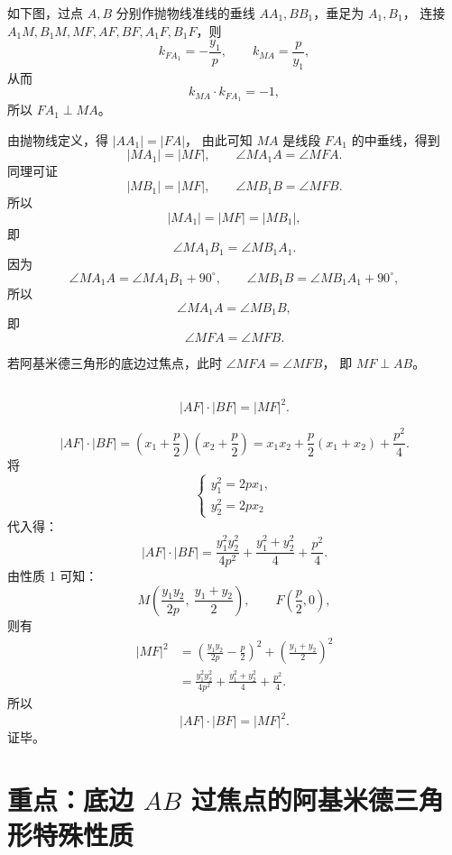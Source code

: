\documentclass{ctexart}
\begin{document}
	\textbf{\color{red}{证明：}}
	如下图，过点 $A,B$ 分别作抛物线准线的垂线 $AA_1,BB_1$，垂足为 $A_1,B_1$，
	连接 $A_1M,B_1M,MF,AF,BF,A_1F,B_1F$，则
	\[
	k_{FA_1}=-\frac{y_1}{p},\qquad k_{MA}=\frac{p}{y_1},
	\]
	从而
	\[
	k_{MA}\cdot k_{FA_1}=-1,
	\]
	所以 $FA_1\perp MA$。
	
	由抛物线定义，得 $|AA_1|=|FA|$，
	由此可知 $MA$ 是线段 $FA_1$ 的中垂线，得到
	\[
	|MA_1|=|MF|,\qquad \angle MA_1A=\angle MFA.
	\]
	同理可证
	\[
	|MB_1|=|MF|,\qquad \angle MB_1B=\angle MFB.
	\]
	所以
	\[
	|MA_1|=|MF|=|MB_1|,
	\]
	即
	\[
	\angle MA_1B_1=\angle MB_1A_1.
	\]
	因为
	\[
	\angle MA_1A=\angle MA_1B_1+90^\circ,\qquad
	\angle MB_1B=\angle MB_1A_1+90^\circ,
	\]
	所以
	\[
	\angle MA_1A=\angle MB_1B,
	\]
	即
	\[
	\angle MFA=\angle MFB.
	\]
	
	\textbf{\color{red}{特别的：}}
	若阿基米德三角形的底边过焦点，此时 $\angle MFA=\angle MFB$，
	即 $MF\perp AB$。
	
	\subsection*{\color{green!60!black}{性质 4}}
	\[
	|AF|\cdot|BF|=|MF|^2.
	\]
	
	\textbf{\color{red}{证明：}}
	\[
	|AF|\cdot|BF|
	=\left(x_1+\frac p2\right)\left(x_2+\frac p2\right)
	=x_1x_2+\frac p2(x_1+x_2)+\frac{p^2}{4}.
	\]
	将
	\[
	\begin{cases}
		y_1^2=2px_1,\\
		y_2^2=2px_2
	\end{cases}
	\]
	代入得：
	\[
	|AF|\cdot|BF|
	=\frac{y_1^2y_2^2}{4p^2}+\frac{y_1^2+y_2^2}{4}+\frac{p^2}{4}.
	\]
	由性质 1 可知：
	\[
	M\!\left(\frac{y_1y_2}{2p},\ \frac{y_1+y_2}{2}\right),\qquad
	F\!\left(\frac p2,0\right),
	\]
	则有
	\begin{align*}
		|MF|^2
		&=\left(\frac{y_1y_2}{2p}-\frac p2\right)^2+\left(\frac{y_1+y_2}{2}\right)^2\\
		&=\frac{y_1^2y_2^2}{4p^2}+\frac{y_1^2+y_2^2}{4}+\frac{p^2}{4}.
	\end{align*}
	所以
	\[
	|AF|\cdot|BF|=|MF|^2.
	\]
	证毕。
	
	
	
	\section*{重点：底边 $AB$ 过焦点的阿基米德三角形特殊性质}
	
\end{document}
